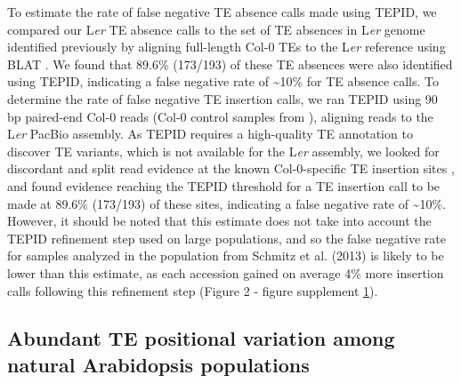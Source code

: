 \documentclass[12pt]{article}
\begin{document}
To estimate the rate of false negative TE absence calls made using
TEPID, we compared our L\emph{er} TE absence calls to the set of TE
absences in L\emph{er} genome identified previously by aligning
full-length Col-0 TEs to the L\emph{er} reference using BLAT
\cite{Quadrana:2016bi}. We found that 89.6\% (173/193) of these TE
absences were also identified using TEPID, indicating a false negative
rate of \textasciitilde{}10\% for TE absence calls. To determine the
rate of false negative TE insertion calls, we ran TEPID using 90 bp
paired-end Col-0 reads (Col-0 control samples from \cite{Jiang:2014ih}),
aligning reads to the L\emph{er }PacBio assembly. As TEPID requires a
high-quality TE annotation to discover TE variants, which is not
available for the L\emph{er }assembly, we looked for discordant and
split read evidence at the known Col-0-specific TE insertion sites
\cite{Quadrana:2016bi}, and found evidence reaching the TEPID threshold
for a TE insertion call to be made at 89.6\% (173/193) of these sites,
indicating a false negative rate of \textasciitilde{}10\%. However, it should be noted
that this estimate does not take into account the TEPID refinement step
used on large populations, and so the false negative rate for samples
analyzed in the population from Schmitz et al. (2013) is likely to be
lower than this estimate, as each accession gained on average 4\% more
insertion calls following this refinement step (Figure 2 - figure
supplement \hyperref[fig2s1]{1}).

\subsection{Abundant TE positional variation among natural Arabidopsis
populations}
\end{document}
